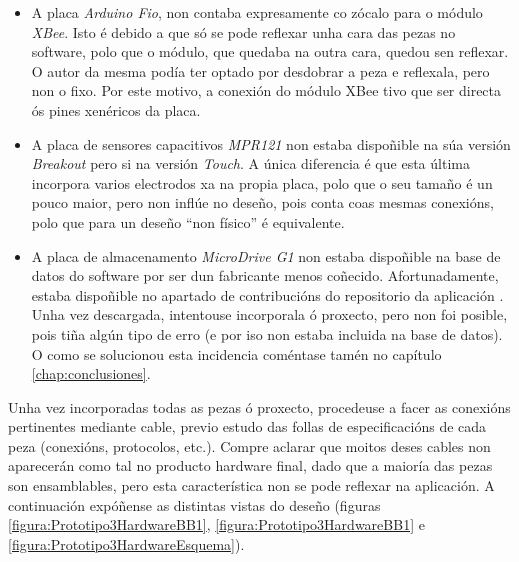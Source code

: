   \begin{itemize}
   \item A placa \textit{Arduino Fio}, non contaba expresamente co zócalo para
         o módulo \textit{XBee}. Isto é debido a que só se pode reflexar unha
         cara das pezas no software, polo que o módulo, que quedaba na outra
         cara, quedou sen reflexar. O autor da mesma podía ter optado por
         desdobrar a peza e reflexala, pero non o fixo. Por este motivo, a
         conexión do módulo XBee tivo que ser directa ós pines xenéricos da
         placa.
   \item A placa de sensores capacitivos \textit{MPR121} non estaba dispoñible
         na súa versión \textit{Breakout} pero si na versión \textit{Touch}. A
         única diferencia é que esta última incorpora varios electrodos xa na
         propia placa, polo que o seu tamaño é un pouco maior, pero non inflúe
         no deseño, pois conta coas mesmas conexións, polo que para un deseño
         ``non físico'' é equivalente.
   \item A placa de almacenamento \textit{MicroDrive G1} non estaba dispoñible
         na base de datos do software por ser dun fabricante menos coñecido.
         Afortunadamente, estaba dispoñible no apartado de contribucións do
         repositorio da aplicación \cite{FioContribucionsFritzing}. Unha vez
         descargada, intentouse incorporala ó proxecto, pero non foi posible,
         pois tiña algún tipo de erro (e por iso non estaba incluida na base de
         datos). O como se solucionou esta incidencia coméntase tamén no
         capítulo \ref{chap:conclusiones}.
  \end{itemize}

  Unha vez incorporadas todas as pezas ó proxecto, procedeuse a facer as
  conexións pertinentes mediante cable, previo estudo das follas de
  especificacións de cada peza (conexións, protocolos, etc.). Compre aclarar
  que moitos deses cables non aparecerán como tal no producto hardware final,
  dado que a maioría das pezas son ensamblables, pero esta característica non
  se pode reflexar na aplicación. A continuación expóñense as distintas vistas
  do deseño (figuras \ref{figura:Prototipo3HardwareBB1},
  \ref{figura:Prototipo3HardwareBB1} e \ref{figura:Prototipo3HardwareEsquema}).

